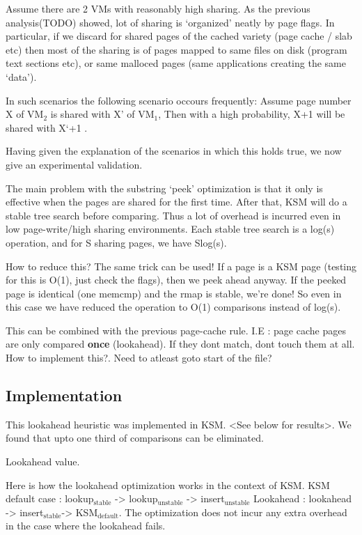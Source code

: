 \documentclass[11pt]{article}
\begin{document}
Assume there are 2 VMs with reasonably high sharing. As the previous analysis(TODO) showed, lot of sharing is `organized' neatly by page flags. In particular, if we discard for shared pages of the cached variety (page cache / slab etc) then most of the sharing is of pages mapped to same files on disk (program text sections etc), or same malloced pages (same applications creating the same `data'). 

In such scenarios the following scenario occours frequently:
Assume page number X of VM$_2$ is shared with X' of VM$_1$, Then with a high probability, X+1 will be shared with X`+1 .

Having given the explanation of the scenarios in which this holds true, we now give an experimental validation.

The main problem with the substring `peek' optimization is that it only is effective when the pages are shared for the first time. After that, KSM will do a stable tree search before comparing. 
Thus a lot of overhead is incurred even in low page-write/high sharing environments. Each stable tree search is a log(s) operation, and for S sharing pages, we have Slog(s). 

How to reduce this? The same trick can be used! If a page is a KSM page (testing for this is O(1), just check the flags), then we peek ahead anyway. If the peeked page is identical (one memcmp) and the rmap is stable, we're done! So even in this case we have reduced the operation to O(1) comparisons instead of log(s).

This can be combined with the previous page-cache rule.
I.E : page cache pages are only compared \textbf{once} (lookahead). If they dont match, dont touch them at all. 
How to implement this?. Need to atleast goto start of the file?
\subsection{Implementation}
\label{sec-7_1}

This lookahead heuristic was implemented in KSM. <See below for results>. 
We found that upto one third of comparisons can be eliminated.

Lookahead value.

Here is how the lookahead optimization works in the context of KSM. 
KSM default case : lookup$_{\mathrm{stable}}$ -> lookup$_{\mathrm{unstable}}$ -> insert$_{\mathrm{unstable}}$
Lookahead : lookahead -> insert$_{\mathrm{stable}}$-> KSM$_{\mathrm{default}}$.
The optimization does not incur any extra overhead in the case where the lookahead fails.
\end{document}
